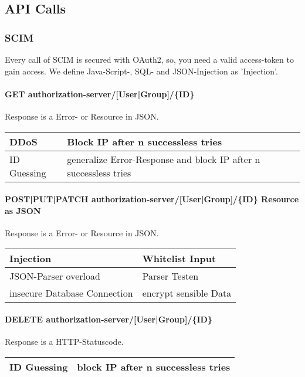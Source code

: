 \subsection{API Calls}
\subsubsection{SCIM}
Every call of SCIM is secured with OAuth2, so, you need a valid access-token to gain access. We define Java-Script-, SQL- and JSON-Injection as 'Injection'.

\paragraph{GET authorization-server/[User|Group]/\{ID\}}

Response is a Error- or Resource in JSON.

\begin{tabular}{|l|l|}
    \hline
    DDoS & Block IP after n successless tries\\
    \hline
    ID Guessing & generalize Error-Response and block IP after n successless tries\\

    \hline
 \end{tabular}

\paragraph{POST|PUT|PATCH authorization-server/[User|Group]/\{ID\} Resource as JSON} 

Response is a Error- or Resource in JSON. 
\begin{tabular}{|l|l|}
    \hline
    Injection & Whitelist Input\\
    \hline
    JSON-Parser overload & Parser Testen \\
    \hline
    insecure Database Connection & encrypt sensible Data \\
    \hline
 \end{tabular}

\paragraph{DELETE authorization-server/[User|Group]/\{ID\}}

Response is a HTTP-Statuscode.

\begin{tabular}{|l|l|}
   \hline
    ID Guessing & block IP after n successless tries\\
    \hline
 \end{tabular}

